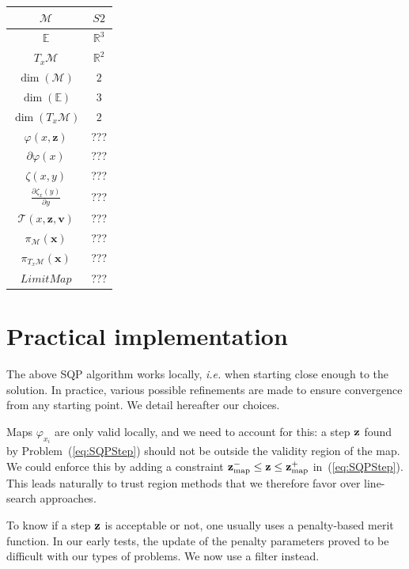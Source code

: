 \begin{table} [H]
\centering
\begin{tabular}{cc}
  \toprule
  $\mathcal{M}$ & $S2$ \\
  \midrule
  $\mathbb{E}$ & $\mathbb{R}^{3}$ \\
  \midrule
  $T_x\mathcal{M}$ & $\mathbb{R}^2$ \\
  \midrule
  $\dim(\mathcal{M})$ & $2$ \\
  \midrule
  $\dim(\mathbb{E})$ & $3$ \\
  \midrule
  $\dim(T_x\mathcal{M})$ & $2$ \\
  \midrule
  $\varphi(x,\mathbf{z})$ & ??? \\
  \midrule
  $\partial \varphi(x)$ & ??? \\
  \midrule
  $\zeta(x,y)$ & ??? \\
  \midrule
  $\frac{\partial \zeta_x(y)}{\partial y}$ & ??? \\
  \midrule
  $\mathcal{T}(x,\mathbf{z}, \mathbf{v})$ & ??? \\
  \midrule
  $\pi_\mathcal{M}(\mathbf{x})$ & ??? \\
  \midrule
  $\pi_{T_x\mathcal{M}}(\mathbf{x})$ & ??? \\
  \midrule
  $Limit Map$ & ??? \\
  \bottomrule
\end{tabular}
\end{table}



\section{Practical implementation}
\label{sec:practical_implementation}

The above SQP algorithm works locally, \emph{i.e.} when starting close enough to the solution.
In practice, various possible refinements are made to ensure convergence from any starting point.
We detail hereafter our choices.

Maps $\varphi_{x_i}$ are only valid locally, and we need to account for this: a step ${\bf z}$ found by Problem~(\ref{eq:SQPStep}) should not be outside the validity region of the map.
We could enforce this by adding a constraint ${\bf z}_{\text{map}}^- \leq {\bf z} \leq {\bf z}_{\text{map}}^+$ in~(\ref{eq:SQPStep}).
This leads naturally to trust region methods that we therefore favor over line-search approaches.

To know if a step ${\bf z}$ is acceptable or not, one usually uses a penalty-based merit function.
In our early tests, the update of the penalty parameters proved to be difficult with our types of problems.
We now use a filter instead.

